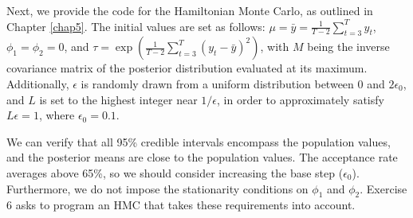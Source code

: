 Next, we provide the code for the Hamiltonian Monte Carlo, as outlined in Chapter \ref{chap5}. The initial values are set as follows: $\mu=\bar{y}=\frac{1}{T-2}\sum_{t=3}^T y_t$, $\phi_1=\phi_2=0$, and $\tau=\exp\left(\frac{1}{T-2}\sum_{t=3}^T(y_t-\bar{y})^2\right)$, with $M$ being the inverse covariance matrix of the posterior distribution evaluated at its maximum. Additionally, $\epsilon$ is randomly drawn from a uniform distribution between 0 and $2\epsilon_0$, and $L$ is set to the highest integer near $1/\epsilon$, in order to approximately satisfy $L\epsilon=1$, where $\epsilon_0=0.1$.

We can verify that all 95\% credible intervals encompass the population values, and the posterior means are close to the population values. The acceptance rate averages above 65\%, so we should consider increasing the base step ($\epsilon_0$). Furthermore, we do not impose the stationarity conditions on $\phi_1$ and $\phi_2$. Exercise 6 asks to program an HMC that takes these requirements into account.

